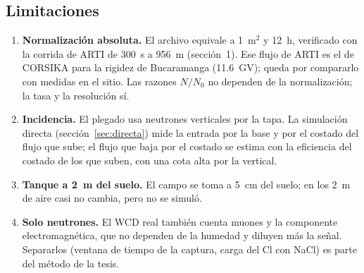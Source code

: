 \documentclass[11pt,a4paper]{article}
\begin{document}
\subsection{Limitaciones}\label{sec:lim}
\begin{enumerate}
\item \textbf{Normalización absoluta.} El archivo  equivale a 1~m$^2$ y 12~h, verificado
con la corrida de ARTI de 300~s a 956~m (sección~1). Ese flujo de ARTI es el de CORSIKA para la rigidez de Bucaramanga
(11.6~GV); queda por compararlo con medidas en el sitio. Las razones $N/N_0$ no dependen de la normalización; la tasa y
la resolución sí.
\item \textbf{Incidencia.} El plegado usa neutrones verticales por la tapa. La simulación directa
(sección~\ref{sec:directa}) mide la entrada por la base y por el costado del flujo que sube; el flujo que baja por el
costado se estima con la eficiencia del costado de los que suben, con una cota alta por la vertical.
\item \textbf{Tanque a 2~m del suelo.} El campo se toma a 5~cm del suelo; en los 2~m de aire casi no cambia, pero no
se simuló.
\item \textbf{Solo neutrones.} El WCD real también cuenta muones y la componente electromagnética, que no dependen de la
humedad y diluyen más la señal. Separarlos (ventana de tiempo de la captura, carga del Cl con NaCl) es parte del método
de la tesis.
\end{enumerate}
\end{document}
